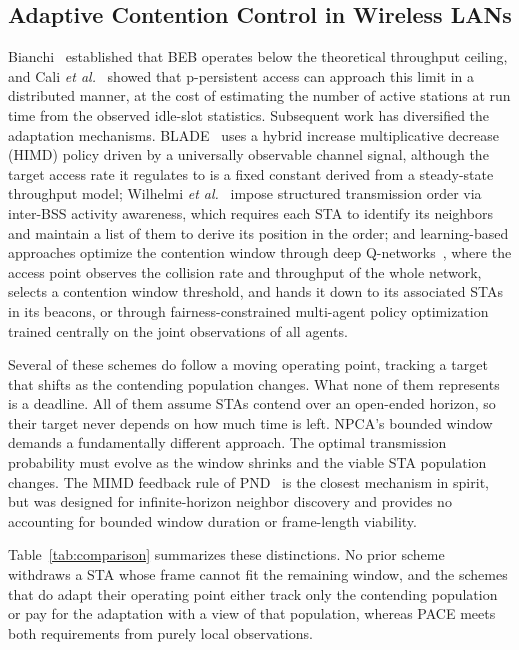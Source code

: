 \documentclass[conference]{IEEEtran}
\begin{document}
\subsection{Adaptive Contention Control in Wireless LANs}

Bianchi~\cite{bianchi2000performance} established that BEB operates below
the theoretical throughput ceiling, and Cali \textit{et al.}~\cite{cali2002dynamic}
showed that p-persistent access can approach this limit in a distributed
manner, at the cost of estimating the number of active stations at run time
from the observed idle-slot statistics. Subsequent work has diversified
the adaptation mechanisms. BLADE~\cite{guo2026blade} uses a hybrid increase
multiplicative decrease (HIMD) policy
driven by a universally observable channel signal, although the target
access rate it regulates to is a fixed constant derived from a steady-state
throughput model; Wilhelmi
\textit{et al.}~\cite{wilhelmi2025s} impose structured transmission order
via inter-BSS activity awareness, which requires each STA to identify its
neighbors and maintain a list of them to derive its position in the order;
and learning-based approaches
optimize the contention window through deep Q-networks~\cite{zuo2025adaptive},
where the access point observes the collision rate and throughput of the
whole network, selects a contention window threshold, and hands it down to
its associated STAs in its beacons, or through fairness-constrained multi-agent policy
optimization~\cite{pan2025ai} trained centrally on the joint observations of
all agents.

Several of these schemes do follow a moving operating point, tracking a
target that shifts as the contending population changes. What none of them
represents is a deadline. All of them assume STAs contend over an
open-ended horizon, so their target never depends on how much time is left.
NPCA's bounded window demands a fundamentally different approach. The
optimal transmission probability must evolve as the window shrinks and the
viable STA population changes. The MIMD feedback rule of PND~\cite{song2014pnd} is
the closest mechanism in spirit, but was designed for infinite-horizon
neighbor discovery and provides no accounting for bounded window duration
or frame-length viability.

Table~\ref{tab:comparison} summarizes these distinctions. No prior scheme
withdraws a STA whose frame cannot fit the remaining window, and the schemes
that do adapt their operating point either track only the contending
population or pay for the adaptation with a view of that population, whereas
PACE meets both requirements from purely local observations.
\end{document}
